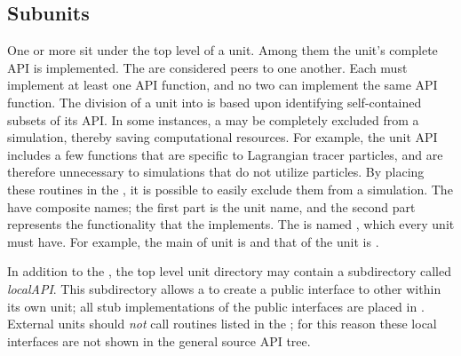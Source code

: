 \subsection{Subunits}
One or more  %
\subunits sit under the top level of a unit.  
Among them the unit's complete API is implemented. The \subunits are
considered peers to one another.  Each \subunit must implement at
least one API function, and no two \subunits can implement the same
API function. The division of a unit into \subunits is based upon
identifying self-contained subsets of its API. In some instances, a
\subunit may be completely excluded from a simulation, thereby saving
computational resources. For example, the  unit API
includes a few functions that are specific to Lagrangian tracer particles, and
are therefore unnecessary to simulations that do not utilize
particles.  By placing these routines in the 
\subunit, it is possible to easily exclude them from a simulation.
The \subunits have composite names; the first part is the unit name,
and the second part represents the functionality that the \subunit
implements. The %
is named ,
which every unit must have. For example, the main \subunit of
 unit is  and that of the  unit
is . 

In addition to the \subunits, the top level unit
directory may contain a subdirectory called \emph{localAPI}. This
subdirectory allows a \subunit to create a public interface to other
\subunits within its own unit; all stub implementations of the \subunit
public interfaces are placed in .   External units should \emph{not}
call routines listed in the ; for this reason these
local interfaces are not shown in the general source API tree.

